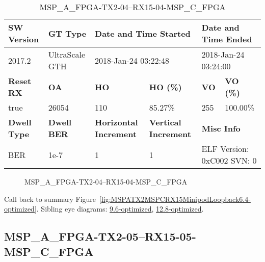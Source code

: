 \begin{table}[h]
\centering
\caption{MSP\_A\_FPGA-TX2-04--RX15-04-MSP\_C\_FPGA}
\label{tab:MSPAFPGATX204RX1504MSPCFPGA6.4-optimized}
\begin{tabular}{@{}|l|l|l|l|l|l|@{}}
\toprule
\textbf{SW Version}                & \textbf{GT Type}   & \multicolumn{2}{l|}{\textbf{Date and Time Started}}            & \multicolumn{2}{l|}{\textbf{Date and Time Ended}}        \\ \midrule
2017.2                       & UltraScale GTH          & \multicolumn{2}{l|}{2018-Jan-24 03:22:48}                   & \multicolumn{2}{l|}{2018-Jan-24 03:24:00}               \\ \midrule
\textbf{Reset RX}                  & \textbf{OA} & \textbf{HO}   & \textbf{HO (\%)} & \textbf{VO} & \textbf{VO (\%)} \\ \midrule
true & 26054        & 110          & 85.27\%        & 255        & 100.00\%       \\ \midrule
\textbf{Dwell Type}                & \textbf{Dwell BER} & \textbf{Horizontal Increment} & \textbf{Vertical Increment}    & \multicolumn{2}{l|}{\textbf{Misc Info}}                  \\ \midrule
BER                            & 1e-7        & 1        & 1           & \multicolumn{2}{l|}{ELF Version: 0xC002 SVN: 0}                         \\ \bottomrule
\end{tabular}
\end{table}

\begin{figure}[h]
\caption{MSP\_A\_FPGA-TX2-04--RX15-04-MSP\_C\_FPGA} \label{fig:MSPAFPGATX204RX1504MSPCFPGA6.4-optimized}
\end{figure}

Call back to summary Figure~\ref{fig:MSPATX2MSPCRX15MinipodLoopback6.4-optimized}.
Sibling eye diagrams: \hyperref[sec:MSPAFPGATX204RX1504MSPCFPGA9.6-optimized]{9.6-optimized}, \hyperref[sec:MSPAFPGATX204RX1504MSPCFPGA12.8-optimized]{12.8-optimized}.

\clearpage
\newpage


\subsection{MSP\_A\_FPGA-TX2-05--RX15-05-MSP\_C\_FPGA}\label{sec:MSPAFPGATX205RX1505MSPCFPGA6.4-optimized}


